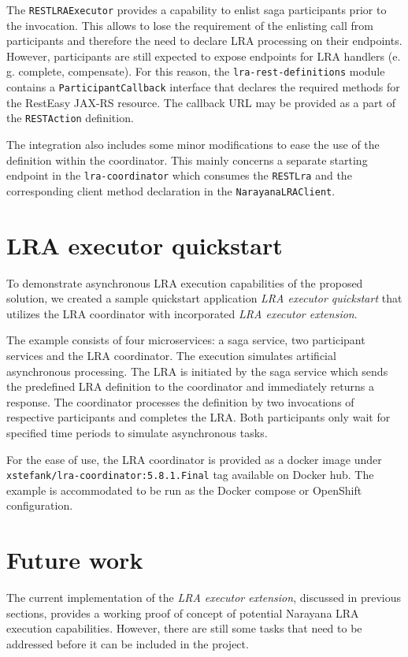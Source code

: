 \documentclass[oneside,
  digital, %
  table,   %
  lof,     %
  lot,     %
]{fithesis3}
\begin{document}
The \texttt{RESTLRAExecutor} provides a capability to enlist saga participants prior to the invocation. This allows to lose the requirement of the enlisting call from participants and therefore the need to declare LRA processing on their endpoints. However, participants are still expected to expose endpoints for LRA handlers (e. g. complete, compensate). For this reason, the \texttt{lra-rest-definitions} module contains a \texttt{ParticipantCallback} interface that declares the required methods for the RestEasy JAX-RS resource. The callback URL may be provided as a part of the \texttt{RESTAction} definition.

The integration also includes some minor modifications to ease the use of the definition within the coordinator. This mainly concerns a separate starting endpoint in the \texttt{lra-coordinator} which consumes the \texttt{RESTLra} and the corresponding client method declaration in the \texttt{NarayanaLRAClient}.

\section{LRA executor quickstart}

To demonstrate asynchronous LRA execution capabilities of the proposed solution, we created a sample quickstart application \textit{LRA executor quickstart} that utilizes the LRA coordinator with incorporated \textit{LRA executor extension}. 

The example consists of four microservices: a saga service, two participant services and the LRA coordinator. The execution simulates artificial asynchronous processing. The LRA is initiated by the saga service which sends the predefined LRA definition to the coordinator and immediately returns a response. The coordinator processes the definition by two invocations of respective participants and completes the LRA. Both participants only wait for specified time periods to simulate asynchronous tasks.

For the ease of use, the LRA coordinator is provided as a docker image under \texttt{xstefank/lra-coordinator:5.8.1.Final} tag available on Docker hub. The example is accommodated to be run as the Docker compose or OpenShift configuration.

\section{Future work}

The current implementation of the \textit{LRA executor extension}, discussed in previous sections, provides a working proof of concept of potential Narayana LRA execution capabilities. However, there are still some tasks that need to be addressed before it can be included in the project.
\end{document}
